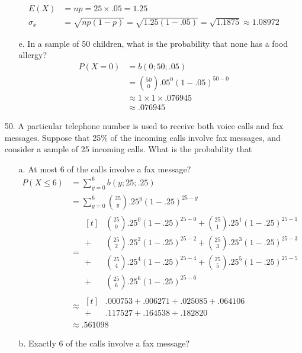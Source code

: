 \documentclass[letterpaper,12pt]{article}
\newcommand{\bp}[3]{%
  \binom{#2}{#1}#3^#1(1 - #3)^{#2 - #1}%
}
\begin{document}
\begin{enumerate}
\begin{enumerate}
        \begin{align*}
          E(X) &= np = 25 \times .05 = 1.25 \\
          \sigma_x &= \sqrt{np(1 - p)} = \sqrt{1.25(1 - .05)} = \sqrt{1.1875} \approx 1.08972
        \end{align*}
      \item[e.]
        In a sample of 50 children, what is the probability that none has a food allergy?
        \begin{align*}
          P(X = 0) &= b(0; 50; .05) \\\
          &= \bp{0}{50}{.05} \\
          &\approx 1 \times 1 \times .076945 \\
          &\approx .076945
        \end{align*}
    \end{enumerate}
  \item[50.]
    A particular telephone number is used to receive both voice calls and fax messages. Suppose that 25\% of the incoming calls involve fax messages, and consider a sample of 25 incoming calls. What is the probability that
    \begin{enumerate}
      \item[a.]
        At most 6 of the calls involve a fax message?
        \begin{align*}
          P(X \le 6) &= \sum_{y = 0}^6 b(y; 25; .25) \\
          &= \sum_{y = 0}^6 \bp{y}{25}{.25} \\
          &= \begin{aligned}[t]
              &\bp{0}{25}{.25} + \bp{1}{25}{.25} \\
            + &\bp{2}{25}{.25} + \bp{3}{25}{.25} \\
            + &\bp{4}{25}{.25} + \bp{5}{25}{.25} \\
            + &\bp{6}{25}{.25}
          \end{aligned} \\
          &\approx \begin{aligned}[t]
              &.000753 + .006271 + .025085 + .064106 \\
            + &.117527 + .164538 + .182820
          \end{aligned} \\
          &\approx .561098
        \end{align*}
      \item[b.]
        Exactly 6 of the calls involve a fax message?

\end{enumerate}
\end{enumerate}
\end{document}
